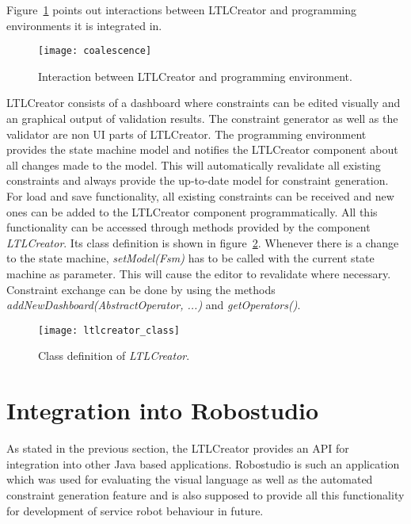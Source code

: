 Figure~\ref{fig:coalescence} points out interactions between LTLCreator and programming environments it is integrated in.
\begin{figure}[htbp]
  \centering
  \texttt{[image: coalescence]}
  \caption{Interaction between LTLCreator and programming environment.}
  \label{fig:coalescence}
\end{figure}
LTLCreator consists of a dashboard where constraints can be edited visually and an graphical output of validation results. The constraint generator as well as the validator are non UI parts of LTLCreator.
The programming environment provides the state machine model and notifies the LTLCreator component about all changes made to the model. This will automatically revalidate all existing constraints and always provide the up-to-date model for constraint generation.
For load and save functionality, all existing constraints can be received and new ones can be added to the LTLCreator component programmatically.
All this functionality can be accessed through methods provided by the component \emph{LTLCreator}. Its class definition is shown in figure~\ref{fig:ltlcreator_class}. Whenever there is a change to the state machine, \emph{setModel(Fsm)} has to be called with the current state machine as parameter. This will cause the editor to revalidate where necessary. Constraint exchange can be done by using the methods \emph{addNewDashboard(AbstractOperator, ...)} and \emph{getOperators()}.

\begin{figure}[htbp]
  \centering
  \texttt{[image: ltlcreator\_class]}
  \caption{Class definition of \emph{LTLCreator}.}
  \label{fig:ltlcreator_class}
\end{figure}







\section{Integration into Robostudio}
\label{sec:integrationintorobostudio}

As stated in the previous section, the LTLCreator provides an API for integration into other Java based applications. Robostudio is such an application which was used for evaluating the visual language as well as the automated constraint generation feature and is also supposed to provide all this functionality for development of service robot behaviour in future.

